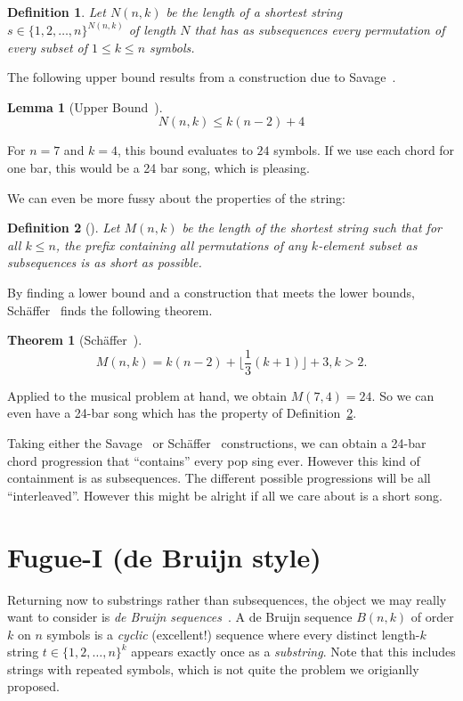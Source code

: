 \documentclass{article}
\newtheorem{lemma}{Lemma}
\newtheorem{theorem}{Theorem}
\newtheorem{definition}{Definition}
\begin{document}
\begin{definition}
  Let $N(n,k)$ be the length of a shortest string
  $s\in\{1,2,\dots,n\}^{N(n,k)}$ of length $N$ that has as subsequences
  every permutation of every subset of $1\leq k\leq n$ symbols.
\end{definition}

The following upper bound results from a construction due to
Savage~\cite{Sav85}. 
\begin{lemma}[Upper Bound~\cite{Sav85}]
  \begin{equation*}
    N(n,k) \leq k(n-2)+4
\end{equation*}
\end{lemma}
For $n=7$ and $k=4$, this bound evaluates to $24$ symbols. If we use
each chord for one bar, this would be a 24 bar song, which is
pleasing.

We can even be more fussy about the properties of the string: 
\begin{definition}[\cite{KouHu75}]\label{def:M}
  Let $M(n,k)$ be the length of the shortest string such that for all
  $k\leq n$, the prefix containing all permutations of any $k$-element
  subset as subsequences is as short as possible. 
\end{definition}
By finding a lower bound and a construction that meets the lower
bounds, Sch\"affer~\cite{Sch87} finds the following theorem.
\begin{theorem}[Sch\"affer~\cite{Sch87}]
  \begin{equation*}
    M(n,k) = k(n-2)+\lfloor \frac{1}{3}\left(k+1\right) \rfloor +
    3, k>2.
  \end{equation*}
\end{theorem}
Applied to the musical problem at hand, we obtain $M(7,4)=24$. So we
can even have a 24-bar song which has the property of
Definition~\ref{def:M}.  

Taking either the Savage~\cite{Sav85} or Sch\"affer~\cite{Sch87}
constructions, we can obtain a 24-bar chord progression that ``contains''
every pop sing ever. However this kind of containment is as
subsequences. The different possible progressions will be all
``interleaved''. However this might be alright if all we care about is
a short song.

\section{Fugue-I (de Bruijn style)}
Returning now to substrings rather than subsequences, the object we
may really want to consider is \emph{de Bruijn sequences}~\cite{deB46}. A
de Bruijn sequence $B(n,k)$ of order $k$ on $n$ symbols is a
\emph{cyclic} (excellent!)  sequence where every distinct length-$k$
string $t\in\{1,2,\dots,n\}^k$ appears exactly once as a
\emph{substring}. Note that this includes strings with repeated
symbols, which is not quite the problem we origianlly proposed.
\end{document}
